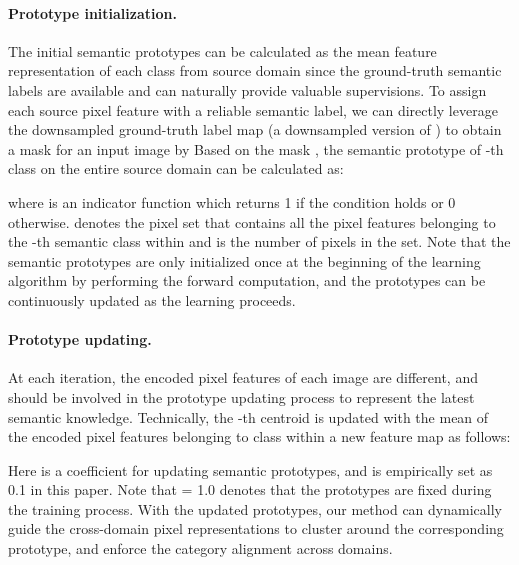 \documentclass[runningheads]{llncs}
\begin{document}
\paragraph{Prototype initialization.} The initial semantic prototypes can be calculated as the mean feature representation of each class from source domain since the ground-truth semantic labels are available and can naturally provide valuable supervisions. To assign each source pixel feature with a reliable semantic label, we can directly leverage the downsampled ground-truth label map  (a downsampled version of ) to obtain a mask  for an input image by 
Based on the mask , the semantic prototype of -th class on the entire source domain can be calculated as:
 \begin{small}

\end{small}where  is an indicator function which returns 1 if the condition holds or 0 otherwise.  denotes the pixel set that contains all the pixel features belonging to the -th semantic class within  and  is the number of pixels in the set. Note that the semantic prototypes are only initialized once at the beginning of the learning algorithm by performing the forward computation, and the prototypes can be continuously updated as the learning proceeds. 

\paragraph{Prototype updating.} At each iteration, the encoded pixel features of each image are different, and should be involved in the prototype updating process to represent the latest semantic knowledge. Technically, the -th centroid  is updated with the mean of the encoded pixel features belonging to class  within a new feature map  as follows:\begin{small}
\end{small}\begin{small}
    
\end{small}Here  is a coefficient for updating semantic prototypes, and  is empirically set as 0.1 in this paper. Note that  = 1.0 denotes that the prototypes are fixed during the training process. With the updated prototypes, our method can dynamically guide the cross-domain pixel representations to cluster around the corresponding prototype, and enforce the category alignment across domains.
\end{document}
